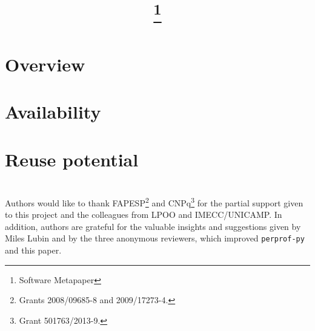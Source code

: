 \documentclass{article}
\begin{document}
\title{\mytitle\thanks{Software Metapaper}}
\author{\myauthor}
\date{\small \myaffiliation}
\maketitle
    \begin{abstract}
      
    \end{abstract}



\section{Overview}


\section{Availability}


\section{Reuse potential}



\section*{}
Authors would like to thank FAPESP\footnote{Grants 2008/09685-8 and 2009/17273-4.}
and CNPq\footnote{Grant 501763/2013-9.} for the
partial support given to this project
and the colleagues from LPOO and IMECC/UNICAMP.
In addition,  authors are grateful for the valuable insights and suggestions 
given by Miles Lubin and by the three anonymous reviewers, which  improved
{\tt perprof-py} and this paper.

\printbibliography
\end{document}
